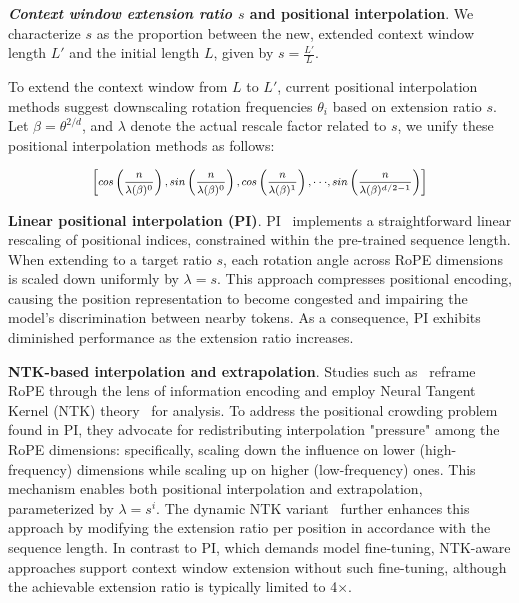 \textbf{\emph{Context window extension ratio $s$} and positional interpolation}. We characterize $s$ as the proportion between the new, extended context window length $L'$ and the initial length $L$, given by $s = \frac{L'}{L}$.

To extend the context window from $L$ to $L'$, current positional interpolation methods suggest downscaling rotation frequencies $\theta_i$ based on extension ratio $s$. Let $\beta=\theta^{2/d}$, and $\lambda$ denote the actual rescale factor related to $s$, we   unify these positional interpolation methods as follows:

\begin{equation}	
	\fontsize{7.5}{7.5} \selectfont
	\label{eq:unified_rope}
	\begin{aligned}
		\left[cos\left(\frac{n}{\lambda(\beta)^0}\right), sin \left(\frac{n}{\lambda(\beta)^0}\right), cos\left(\frac{n}{\lambda(\beta)^1}\right), \cdot\cdot\cdot,  sin \left(\frac{n}{\lambda(\beta)^{d/2-1}}\right) \right]   
	\end{aligned}
\end{equation}

\textbf{Linear positional interpolation (PI)}. PI~\cite{pi} implements a straightforward linear rescaling of positional indices, constrained within the pre-trained sequence length. When extending to a target ratio $s$, each rotation angle across RoPE dimensions is scaled down uniformly by $\lambda=s$. This approach compresses positional encoding, causing the position representation to become congested and impairing the model's discrimination between nearby tokens. As a consequence, PI exhibits diminished performance as the extension ratio increases.

\textbf{NTK-based interpolation and extrapolation}. Studies such as~\cite{ntk,dynamicntk} reframe RoPE through the lens of information encoding and employ Neural Tangent Kernel (NTK) theory~\cite{jacot2018neural,tancik2020fourier} for analysis. To address the positional crowding problem found in PI, they advocate for redistributing interpolation "pressure" among the RoPE dimensions: specifically, scaling down the influence on lower (high-frequency) dimensions while scaling up on higher (low-frequency) ones. This mechanism enables both positional interpolation and extrapolation, parameterized by $\lambda=s^{i}$. The dynamic NTK variant~\cite{dynamicntk} further enhances this approach by modifying the extension ratio per position in accordance with the sequence length. In contrast to PI, which demands model fine-tuning, NTK-aware approaches support context window extension without such fine-tuning, although the achievable extension ratio is typically limited to 4$\times$.

